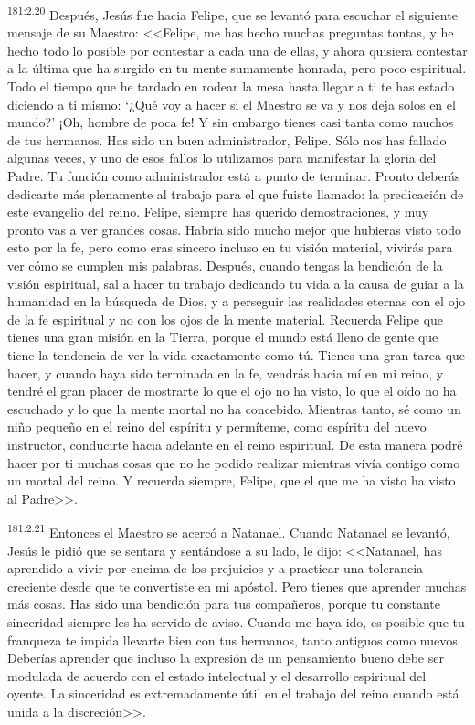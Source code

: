 \par 
\textsuperscript{181:2.20} Después, Jesús fue hacia Felipe, que se levantó para escuchar el siguiente mensaje de su Maestro: <<Felipe, me has hecho muchas preguntas tontas, y he hecho todo lo posible por contestar a cada una de ellas, y ahora quisiera contestar a la última que ha surgido en tu mente sumamente honrada, pero poco espiritual. Todo el tiempo que he tardado en rodear la mesa hasta llegar a ti te has estado diciendo a ti mismo: `¿Qué voy a hacer si el Maestro se va y nos deja solos en el mundo?' ¡Oh, hombre de poca fe! Y sin embargo tienes casi tanta como muchos de tus hermanos. Has sido un buen administrador, Felipe. Sólo nos has fallado algunas veces, y uno de esos fallos lo utilizamos para manifestar la gloria del Padre. Tu función como administrador está a punto de terminar. Pronto deberás dedicarte más plenamente al trabajo para el que fuiste llamado: la predicación de este evangelio del reino. Felipe, siempre has querido demostraciones, y muy pronto vas a ver grandes cosas. Habría sido mucho mejor que hubieras visto todo esto por la fe, pero como eras sincero incluso en tu visión material, vivirás para ver cómo se cumplen mis palabras. Después, cuando tengas la bendición de la visión espiritual, sal a hacer tu trabajo dedicando tu vida a la causa de guiar a la humanidad en la búsqueda de Dios, y a perseguir las realidades eternas con el ojo de la fe espiritual y no con los ojos de la mente material. Recuerda Felipe que tienes una gran misión en la Tierra, porque el mundo está lleno de gente que tiene la tendencia de ver la vida exactamente como tú. Tienes una gran tarea que hacer, y cuando haya sido terminada en la fe, vendrás hacia mí en mi reino, y tendré el gran placer de mostrarte lo que el ojo no ha visto, lo que el oído no ha escuchado y lo que la mente mortal no ha concebido. Mientras tanto, sé como un niño pequeño en el reino del espíritu y permíteme, como espíritu del nuevo instructor, conducirte hacia adelante en el reino espiritual. De esta manera podré hacer por ti muchas cosas que no he podido realizar mientras vivía contigo como un mortal del reino. Y recuerda siempre, Felipe, que el que me ha visto ha visto al Padre>>.

\par 
\textsuperscript{181:2.21} Entonces el Maestro se acercó a Natanael. Cuando Natanael se levantó, Jesús le pidió que se sentara y sentándose a su lado, le dijo: <<Natanael, has aprendido a vivir por encima de los prejuicios y a practicar una tolerancia creciente desde que te convertiste en mi apóstol. Pero tienes que aprender muchas más cosas. Has sido una bendición para tus compañeros, porque tu constante sinceridad siempre les ha servido de aviso. Cuando me haya ido, es posible que tu franqueza te impida llevarte bien con tus hermanos, tanto antiguos como nuevos. Deberías aprender que incluso la expresión de un pensamiento bueno debe ser modulada de acuerdo con el estado intelectual y el desarrollo espiritual del oyente. La sinceridad es extremadamente útil en el trabajo del reino cuando está unida a la discreción>>.


